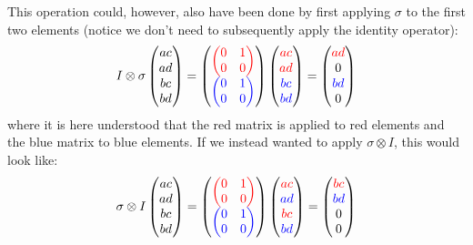This operation could, however, also have been done by first applying $\sigma$ to the first two elements (notice we don't need to subsequently apply the identity operator):
\begin{equation}
    I \otimes \sigma \begin{pmatrix} {a}{c} \\ {a}{d} \\ {b}{c} \\ {b}{d} \end{pmatrix} = \begin{pmatrix}
    \color{red}{\begin{pmatrix}
    0 & 1 \\ 0 & 0
\end{pmatrix}} \\ \color{blue}{\begin{pmatrix}
    0 & 1 \\ 0 & 0
\end{pmatrix}}
\end{pmatrix} \begin{pmatrix} \color{red}{a}{c} \\ \color{red}{a}{d} \\ \color{blue}{b}{c} \\ \color{blue}{b}{d} \end{pmatrix} = \begin{pmatrix} \color{red}{a}{d} \\ 0 \\ \color{blue}{bd} \\ 0 \end{pmatrix}
\end{equation}
where it is here understood that the red matrix is applied to red elements and the blue matrix to blue elements. If we instead wanted to apply $\sigma \otimes I$, this would look like: 
\begin{equation}
    \sigma \otimes I \begin{pmatrix} {a}{c} \\ {a}{d} \\ {b}{c} \\ {b}{d} \end{pmatrix} = \begin{pmatrix}
    \color{red}{\begin{pmatrix}
    0 & 1 \\ 0 & 0
\end{pmatrix}} \\ \color{blue}{\begin{pmatrix}
    0 & 1 \\ 0 & 0
\end{pmatrix}}
\end{pmatrix} \begin{pmatrix} \color{red}{a}{c} \\ \color{blue}{a}{d} \\ \color{red}{b}{c} \\ \color{blue}{b}{d} \end{pmatrix} = \begin{pmatrix} \color{red}{b}{c} \\  \color{blue}{b}{d}  \\ 0 \\ 0 \end{pmatrix}
\end{equation}
